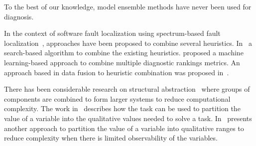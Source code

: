 To the best of our knowledge, model ensemble methods have never been
used for diagnosis.

In the context of software fault localization using spectrum-based
fault localization~\citep{abreu2007accuracy}, approaches have been
proposed to combine several heuristics. In~\citep{wang2011search} a
search-based algorithm to combine the existing
heuristics. \cite{xuan2014learning} proposed a machine learning-based
approach to combine multiple diagnostic rankings metrics. An approach
based in data fusion to heuristic combination was proposed
in~\citep{lo2014fusion}.


There has been considerable research on structural
abstraction~\citep{chittaro2004hierarchical,hamscher1990xde} where
groups of components are combined to form larger systems to reduce
computational complexity. The work in~\citep{sachenbacher2005task}
describes how the task can be used to partition the value of a
variable into the qualitative values needed to solve a
task. In~\citep{torta2003automatic} presents another approach to
partition the value of a variable into qualitative ranges to reduce
complexity when there is limited observability of the variables.
